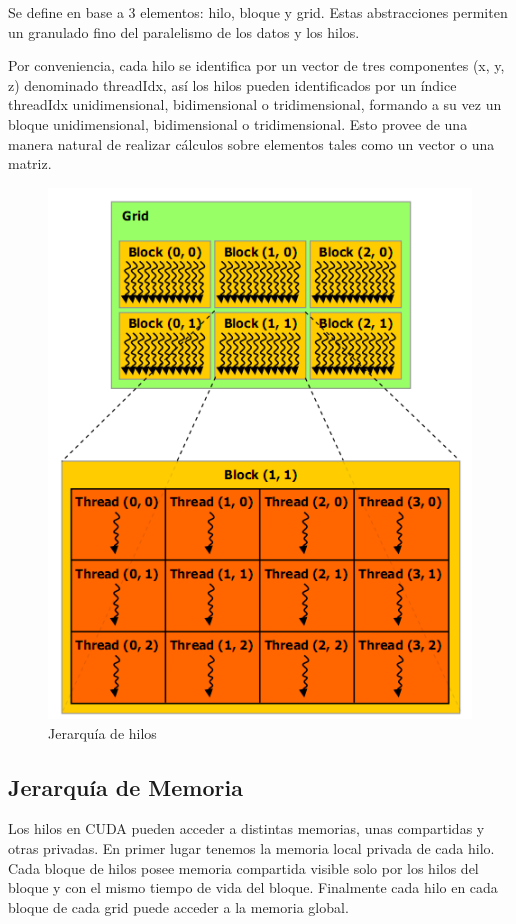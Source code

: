 \documentclass[twoside]{article}
\begin{document}
Se define en base a 3 elementos: hilo, bloque y grid. Estas abstracciones permiten un granulado fino del paralelismo de los datos y los hilos.

Por conveniencia, cada hilo se identifica por un vector de tres componentes (x, y, z) denominado threadIdx, así los hilos pueden identificados por un índice threadIdx unidimensional, bidimensional o tridimensional, formando a su vez un bloque unidimensional, bidimensional o tridimensional. Esto provee de una manera natural de realizar cálculos sobre elementos tales como un vector o una matriz.

\begin{figure}
   \begin{center}
      \includegraphics[width=.5\textwidth]{ThreadHierarchy.png}
      \caption{\label{fig:ThreadHierarchy} Jerarquía de hilos}
   \end{center}
\end{figure}

\subsection{Jerarquía de Memoria}

Los hilos en CUDA pueden acceder a distintas memorias, unas compartidas y otras privadas. En primer lugar tenemos la memoria local privada de cada hilo. Cada bloque de hilos posee memoria compartida visible solo por los hilos del bloque y con el mismo tiempo de vida del bloque. Finalmente cada hilo en cada bloque de cada grid puede acceder a la memoria global.
\end{document}
